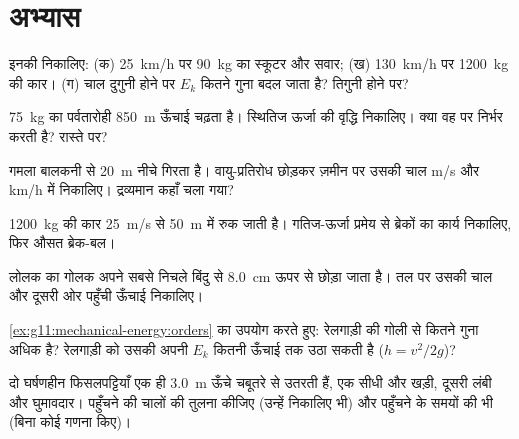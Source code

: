 \section{अभ्यास}

\begin{exercise}[$\star$]\label{exo:g11:mechanical-energy:1}
इनकी  निकालिए: (क) \qty{25}{km/h} पर \qty{90}{kg} का स्कूटर और सवार;
(ख) \qty{130}{km/h} पर \qty{1200}{kg} की कार। (ग) चाल दुगुनी होने पर $E_k$ कितने गुना बदल
जाता है? तिगुनी होने पर?
\end{exercise}

\begin{exercise}[$\star$]\label{exo:g11:mechanical-energy:2}
\qty{75}{kg} का पर्वतारोही \qty{850}{m} ऊँचाई चढ़ता है। स्थितिज ऊर्जा की
वृद्धि निकालिए। क्या वह  पर निर्भर करती है? रास्ते पर?
\end{exercise}

\begin{exercise}[$\star$]\label{exo:g11:mechanical-energy:3}
गमला बालकनी से \qty{20}{m} नीचे गिरता है। वायु-प्रतिरोध छोड़कर ज़मीन पर उसकी चाल
\unit{m/s} और \unit{km/h} में निकालिए। द्रव्यमान कहाँ चला गया?
\end{exercise}

\begin{exercise}[$\star$]\label{exo:g11:mechanical-energy:4}
\qty{1200}{kg} की कार \qty{25}{m/s} से \qty{50}{m} में रुक जाती है। गतिज-ऊर्जा
प्रमेय से ब्रेकों का कार्य निकालिए, फिर औसत ब्रेक-बल।
\end{exercise}

\begin{exercise}[$\star$]\label{exo:g11:mechanical-energy:5}
लोलक का गोलक अपने सबसे निचले बिंदु से \qty{8.0}{cm} ऊपर से छोड़ा जाता है। तल पर
उसकी चाल और दूसरी ओर पहुँची ऊँचाई निकालिए।
\end{exercise}

\begin{exercise}[$\star\star$]\label{exo:g11:mechanical-energy:6}
\cref{ex:g11:mechanical-energy:orders} का उपयोग करते हुए: रेलगाड़ी की  गोली से कितने गुना
अधिक है? रेलगाड़ी को उसकी अपनी $E_k$ कितनी ऊँचाई तक उठा सकती है ($h = v^2/2g$)?
\end{exercise}

\begin{exercise}[$\star\star$]\label{exo:g11:mechanical-energy:7}
दो घर्षणहीन फिसलपट्टियाँ एक ही \qty{3.0}{m} ऊँचे चबूतरे से उतरती हैं, एक सीधी और
खड़ी, दूसरी लंबी और घुमावदार। पहुँचने की चालों की तुलना कीजिए (उन्हें निकालिए
भी) और पहुँचने के समयों की भी (बिना कोई गणना किए)।
\end{exercise}

